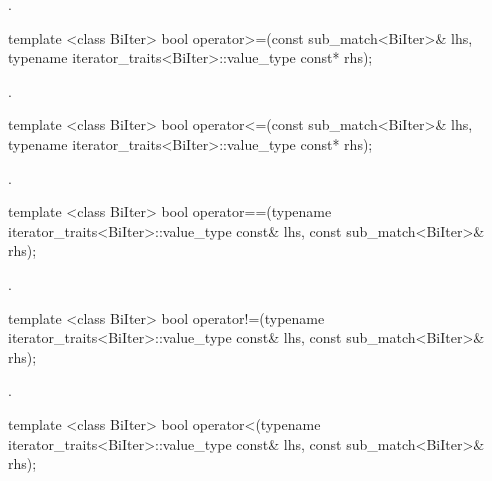 \begin{itemdescr}
\pnum\returns {}.
\end{itemdescr}

%
\begin{itemdecl}
template <class BiIter> 
  bool operator>=(const sub_match<BiIter>& lhs, 
                  typename iterator_traits<BiIter>::value_type const* rhs); 
\end{itemdecl}

\begin{itemdescr}
\pnum\returns {}.
\end{itemdescr}

%
\begin{itemdecl}
template <class BiIter> 
  bool operator<=(const sub_match<BiIter>& lhs, 
                  typename iterator_traits<BiIter>::value_type const* rhs); 
\end{itemdecl}

\begin{itemdescr}
\pnum
\returns {}.
\end{itemdescr}

%
\begin{itemdecl}
template <class BiIter> 
  bool operator==(typename iterator_traits<BiIter>::value_type const& lhs, 
                  const sub_match<BiIter>& rhs);
\end{itemdecl}

\begin{itemdescr}
\pnum
\returns {}.
\end{itemdescr}

%
\begin{itemdecl}
template <class BiIter> 
  bool operator!=(typename iterator_traits<BiIter>::value_type const& lhs, 
                  const sub_match<BiIter>& rhs); 
\end{itemdecl}

\begin{itemdescr}
\pnum
\returns {}.
\end{itemdescr}

%
\begin{itemdecl}
template <class BiIter> 
  bool operator<(typename iterator_traits<BiIter>::value_type const& lhs, 
                 const sub_match<BiIter>& rhs); 
\end{itemdecl}

